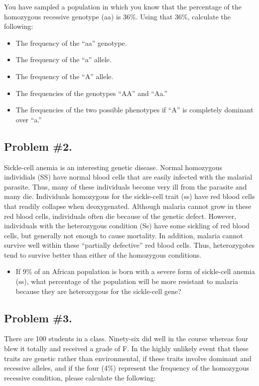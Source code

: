 \documentclass[
  a4paper]{book}
\providecommand{\tightlist}{%
  \setlength{\itemsep}{0pt}\setlength{\parskip}{0pt}}
\begin{document}
You have sampled a population in which you know that the percentage of the homozygous recessive genotype (aa) is 36\%. Using that 36\%, calculate the following:

\begin{itemize}
\tightlist
\item
  The frequency of the ``aa'' genotype.
\item
  The frequency of the ``a'' allele.
\item
  The frequency of the ``A'' allele.
\item
  The frequencies of the genotypes ``AA'' and ``Aa.''
\item
  The frequencies of the two possible phenotypes if ``A'' is completely dominant over ``a.''
\end{itemize}

\subsection{Problem \#2.}\label{problem-2.}

Sickle-cell anemia is an interesting genetic disease. Normal homozygous individials (SS) have normal blood cells that are easily infected with the malarial parasite. Thus, many of these individuals become very ill from the parasite and many die. Individuals homozygous for the sickle-cell trait (ss) have red blood cells that readily collapse when deoxygenated. Although malaria cannot grow in these red blood cells, individuals often die because of the genetic defect. However, individuals with the heterozygous condition (Ss) have some sickling of red blood cells, but generally not enough to cause mortality. In addition, malaria cannot survive well within these ``partially defective'' red blood cells. Thus, heterozygotes tend to survive better than either of the homozygous conditions.

\begin{itemize}
\tightlist
\item
  If 9\% of an African population is born with a severe form of sickle-cell anemia (ss), what percentage of the population will be more resistant to malaria because they are heterozygous for the sickle-cell gene?
\end{itemize}

\subsection{Problem \#3.}\label{problem-3.}

There are 100 students in a class. Ninety-six did well in the course whereas four blew it totally and received a grade of F. In the highly unlikely event that these traits are genetic rather than environmental, if these traits involve dominant and recessive alleles, and if the four (4\%) represent the frequency of the homozygous recessive condition, please calculate the following:
\end{document}
